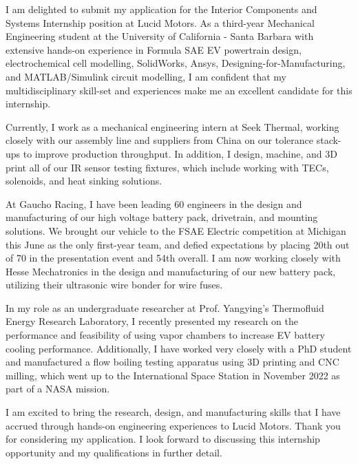 \documentclass[11pt, letterpaper]{awesome-cv} %
\begin{document}
\makecvheader %

\makelettertitle %


\begin{cvletter}


I am delighted to submit my application for the Interior Components and Systems Internship position at Lucid Motors. As a third-year Mechanical Engineering student at the University of California - Santa Barbara with extensive hands-on experience in Formula SAE EV powertrain design, electrochemical cell modelling, SolidWorks, Ansys, Designing-for-Manufacturing, and MATLAB/Simulink circuit modelling, I am confident that my multidisciplinary skill-set and experiences make me an excellent candidate for this internship.

Currently, I work as a mechanical engineering intern at Seek Thermal, working closely with our assembly line and suppliers from China on our tolerance stack-ups to improve production throughput. In addition, I design, machine, and 3D print all of our IR sensor testing fixtures, which include working with TECs, solenoids, and heat sinking solutions.

At Gaucho Racing, I have been leading 60 engineers in the design and manufacturing of our high voltage battery pack, drivetrain, and mounting solutions. We brought our vehicle to the FSAE Electric competition at Michigan this June as the only first-year team, and defied expectations by placing 20th out of 70 in the presentation event and 54th overall. I am now working closely with Hesse Mechatronics in the design and manufacturing of our new battery pack, utilizing their ultrasonic wire bonder for wire fuses. 

In my role as an undergraduate researcher at Prof. Yangying's Thermofluid Energy Research Laboratory, I recently presented my research on the performance and feasibility of using vapor chambers to increase EV battery cooling performance. Additionally, I have worked very closely with a PhD student and manufactured a flow boiling testing apparatus using 3D printing and CNC milling, which went up to the International Space Station in November 2022 as part of a NASA mission. 

I am excited to bring the research, design, and manufacturing skills that I have accrued through hands-on engineering experiences to Lucid Motors. Thank you for considering my application. I look forward to discussing this internship opportunity and my qualifications in further detail.


\end{cvletter}


\makeletterclosing %
\end{document}
